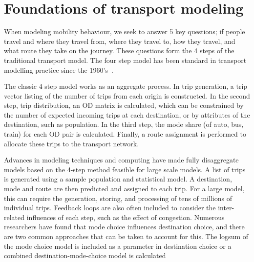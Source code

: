 \section{Foundations of transport modeling}
When modeling mobility behaviour, we seek to answer 5 key questions; if people travel and where they travel from, where they travel to, how they travel, and what route they take on the journey. These questions form the 4 steps of the traditional transport model. The four step model has been standard in transport modelling practice since the 1960's~\parencite{de1994modelling}. 

The classic 4 step model works as an aggregate process. In trip generation, a trip vector listing of the number of trips from each origin is constructed. In the second step, trip distribution, an OD matrix is calculated, which can be constrained by the number of expected incoming trips at each destination, or by attributes of the destination, such as population. In the third step, the mode share (of auto, bus, train) for each OD pair is calculated. Finally, a route assignment is performed to allocate these trips to the transport network. 

Advances in modeling techniques and computing have made fully disaggregate models based on the 4-step method feasible for large scale models. A list of trips is generated using a sample population and statistical model. A destination, mode and route are then predicted and assigned to each trip. For a large model, this can require the generation, storing, and processing of tens of millions of individual trips. Feedback loops are also often included to consider the inter-related influences of each step, such as the effect of congestion. Numerous researchers have found that mode choice influences destination choice, and there are two common approaches that can be taken to account for this. The logsum of the mode choice model is included as a parameter in destination choice \parencite{jonnalagadda2001development, mishra2011functional} or a combined destination-mode-choice model is calculated \parencite{newman2010hierarchical, adler1976joint, boyce1983implementation}

